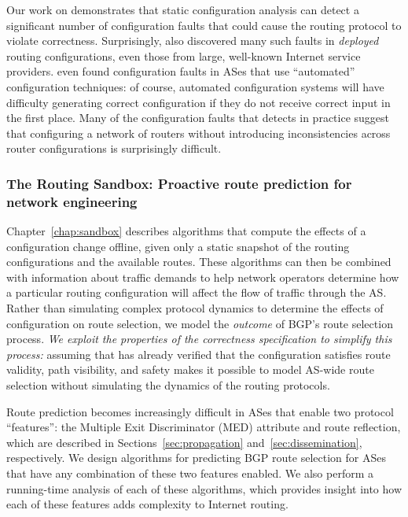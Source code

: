 Our work on \rcc demonstrates that static configuration analysis can
detect a significant number of configuration faults that could cause the
routing protocol to violate correctness. Surprisingly, \rcc also
discovered many such faults in {\em deployed} routing configurations,
even those from large, well-known Internet service providers.  \rcc even
found configuration faults in ASes that use ``automated''
configuration techniques: of course, automated configuration systems
will have difficulty generating correct configuration if they do not
receive correct input in the first place.  Many of the
configuration faults that \rcc detects in practice suggest that
configuring a network 
of routers without introducing inconsistencies across router
configurations is surprisingly difficult.


\subsubsection{The Routing Sandbox: Proactive route prediction for
network engineering}

Chapter~\ref{chap:sandbox} describes algorithms that compute the effects
of a configuration change offline, given only a static snapshot of the
routing configurations and the available routes.  These algorithms can
then be combined with information about traffic demands to help network
operators determine how a particular routing configuration will affect
the flow of traffic through the AS.  Rather than simulating complex
protocol dynamics to determine the effects of configuration on route
selection, we model the {\em outcome} of BGP's route selection process.
{\em We exploit the properties of the correctness specification to
simplify this process:} assuming that \rcc has already verified that the
configuration satisfies route validity, path visibility, and safety
makes it possible to model AS-wide route selection without simulating
the dynamics of the routing protocols.

Route prediction becomes increasingly difficult in ASes that enable two
protocol ``features'': the Multiple Exit Discriminator (MED) attribute
and route reflection, which are described in
Sections~\ref{sec:propagation} and~\ref{sec:dissemination}, respectively.
We design algorithms for predicting BGP 
route selection for ASes that have any combination of these two features
enabled.  We also perform a running-time analysis of each of these
algorithms, which provides insight into how each of these features adds
complexity to Internet routing.

